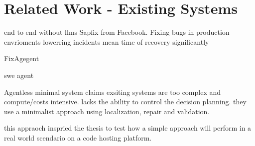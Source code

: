 \section{Related Work - Existing Systems}


end to end without llms Sapfix from Facebook. Fixing bugs in production envrioments lowerring incidents mean time of recovery significantly \cite{margineanSapFixAutomatedEndtoEnd2019}

FixAgegent \cite{leeUnifiedDebuggingApproach2024}

swe agent \cite{yangSWEagentAgentComputerInterfaces2024}

Agentless minimal system \cite{xiaAgentlessDemystifyingLLMbased2024}
claims exsiting systems are too complex and compute/costs intensive.
lacks the ability to control the decision planning.
they use a minimalist approach using localization, repair and validation.


this appraoch inspried the thesis to test how a simple approach will perform in a real world scendario on a code hosting platform.